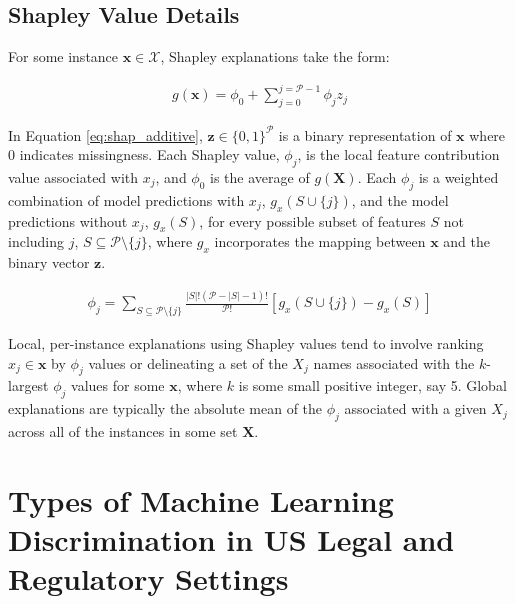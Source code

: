 \documentclass[information,article,submit,moreauthors,pdftex]{definitions/mdpi}
\begin{document}
\subsection{Shapley Value Details}\label{a_ssec:shap}

For some instance $\mathbf{x} \in \mathcal{X}$, Shapley explanations take the form: 

\begin{equation}
\label{eq:shap_additive}
\begin{aligned}
g(\mathbf{x}) = \phi_0 + \sum_{j=0}^{j=\mathcal{P} - 1} \phi_j z_j
\end{aligned}
\end{equation}

\noindent In Equation \ref{eq:shap_additive}, $\mathbf{z} \in \{0,1\}^\mathcal{P}$ is a binary representation of $\mathbf{x}$ where 0 indicates missingness. Each Shapley value, $\phi_j$, is the local feature contribution value associated with $x_j$, and $\phi_0$ is the average of $g(\mathbf{X})$. Each $\phi_j$ is a weighted combination of model predictions with $x_j$, $g_x(S \cup \{j\})$, and the model predictions without $x_j$, $g_x(S)$, for every possible subset of features $S$ not including $j$, $S \subseteq \mathcal{P} \setminus \{j\}$, where $g_x$ incorporates the mapping between $\mathbf{x}$ and the binary vector $\mathbf{z}$. 

\begin{equation}
\label{eq:shap_contrib}
\begin{aligned}
\phi_{j} = \sum_{S \subseteq \mathcal{P} \setminus \{j\}}\frac{|S|!(\mathcal{P} -|S| -1)!}{\mathcal{P}!}[g_x(S \cup \{j\}) - g_x(S)]
\end{aligned}
\end{equation}

\noindent Local, per-instance explanations using Shapley values tend to involve ranking $x_j \in \mathbf{x}$ by $\phi_j$ values or delineating a set of the $X_j$ names associated with the $k$-largest $\phi_j$ values for some $\mathbf{x}$, where $k$ is some small positive integer, say 5. Global explanations are typically the absolute mean of the $\phi_j$ associated with a given $X_j$ across all of the instances in some set $\mathbf{X}$.

\section{Types of Machine Learning Discrimination in US Legal and Regulatory Settings}\label{a_sec:types}
\end{document}
